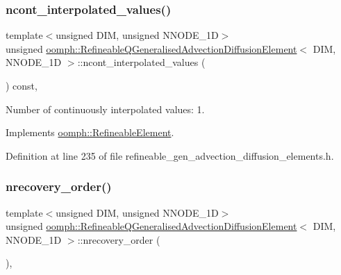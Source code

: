 \subsubsection{\texorpdfstring{ncont\+\_\+interpolated\+\_\+values()}{ncont\_interpolated\_values()}}
{\footnotesize\ttfamily template$<$unsigned D\+IM, unsigned N\+N\+O\+D\+E\+\_\+1D$>$ \\
unsigned \hyperlink{classoomph_1_1RefineableQGeneralisedAdvectionDiffusionElement}{oomph\+::\+Refineable\+Q\+Generalised\+Advection\+Diffusion\+Element}$<$ D\+IM, N\+N\+O\+D\+E\+\_\+1D $>$\+::ncont\+\_\+interpolated\+\_\+values (\begin{DoxyParamCaption}{ }\end{DoxyParamCaption}) const\hspace{0.3cm}{\ttfamily [inline]}, {\ttfamily [virtual]}}



Number of continuously interpolated values\+: 1. 



Implements \hyperlink{classoomph_1_1RefineableElement_a53e171a18c9f43f1db90a6876516a073}{oomph\+::\+Refineable\+Element}.



Definition at line 235 of file refineable\+\_\+gen\+\_\+advection\+\_\+diffusion\+\_\+elements.\+h.

\mbox{\label{classoomph_1_1RefineableQGeneralisedAdvectionDiffusionElement_a5bc265e732c2d5a0c9e5bb699c1cdc6e}} 
\subsubsection{\texorpdfstring{nrecovery\+\_\+order()}{nrecovery\_order()}}
{\footnotesize\ttfamily template$<$unsigned D\+IM, unsigned N\+N\+O\+D\+E\+\_\+1D$>$ \\
unsigned \hyperlink{classoomph_1_1RefineableQGeneralisedAdvectionDiffusionElement}{oomph\+::\+Refineable\+Q\+Generalised\+Advection\+Diffusion\+Element}$<$ D\+IM, N\+N\+O\+D\+E\+\_\+1D $>$\+::nrecovery\+\_\+order (\begin{DoxyParamCaption}{ }\end{DoxyParamCaption})\hspace{0.3cm}{\ttfamily [inline]}, {\ttfamily [virtual]}}



